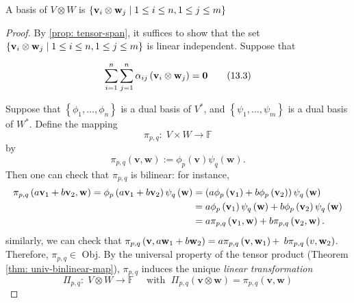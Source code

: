 \begin{theorem} \label{thm:tensorbasis}
    A basis of \(V \otimes  W\) is \(\left\{  {{\bf v}_{i} \otimes  {\bf w}_{j} \mid  1 \leq  i \leq  n,1 \leq  j \leq  m}\right\}\)
\end{theorem} 

\begin{proof}
By \autoref{prop: tensor-span}, it suffices to show that the set \(\left\{  {{\bf v}_{i} \otimes  {\bf w}_{j} \mid  1 \leq  i \leq  n,1 \leq  j \leq  m}\right\}\) is linear independent. Suppose that

\begin{equation}\label{eq: tensor-linear-independece}
    \mathop{\sum }\limits_{{i = 1}}^n\mathop{\sum }\limits_{{j = 1}}^n\alpha_{ij}\left( {{\bf v}_{i} \otimes  {\bf w}_{j}}\right)  = \mathbf{0} \tag{13.3}
\end{equation}


Suppose that \(\left\{  {{\phi }_1,\ldots ,{\phi }_n}\right\}\) is a dual basis of \({V}^{ * }\), and \(\left\{  {{\psi }_1,\ldots ,{\psi }_{m}}\right\}\) is a dual basis of \({W}^{ * }\). Define the mapping
\[
{\pi }_{p,q} : \;V \times  W \rightarrow  \mathbb{F}
\]
by 
$$\pi_{p,q}(\mathbf{v},\mathbf{w}) := {\phi }_{p}\left( \mathbf{v}\right) {\psi }_{q}\left( \mathbf{w}\right).$$
Then one can check that \({\pi }_{p,q}\) is bilinear: for instance,
\begin{align*}
{\pi }_{p,q}\left( {a{\bf v}_1 + b{\bf v}_2,\mathbf{w}}\right)  = {\phi }_{p}\left( {a{\bf v}_1 + b{\bf v}_2}\right) {\psi }_{q}\left( \mathbf{w}\right)
&= \left( {a{\phi }_{p}\left( {\bf v}_1\right)  + b{\phi }_{p}\left( {\bf v}_2\right) }\right) {\psi }_{q}\left( \mathbf{w}\right)\\
&= a{\phi }_{p}\left( {\bf v}_1\right) {\psi }_{q}\left( \mathbf{w}\right)  + b{\phi }_{p}\left( {\bf v}_2\right) {\psi }_{q}\left( \mathbf{w}\right)\\
&= a{\pi }_{p,q}\left( {{\bf v}_1,\mathbf{w}}\right)  + b{\pi }_{p,q}\left( {{\bf v}_2,\mathbf{w}}\right) .
\end{align*}
similarly, we can check that \({\pi }_{p,q}\left( {\mathbf{v},a{\bf w}_1 + b{\bf w}_2}\right)  = a{\pi }_{p,q}\left( {\mathbf{v},{\bf w}_1}\right)  +\)  \(b{\pi }_{p,q}\left( {v,{\bf w}_2}\right)\). Therefore, \({\pi }_{p,q} \in\) Obj. By the universal property of the tensor product (Theorem \ref{thm: univ-binlinear-map}), \({\pi }_{p,q}\) induces the unique {\it linear transformation}
\[
\Pi_{p,q} : \;V \otimes  W \rightarrow  \mathbb{F}
\quad \text{ with }\;\Pi_{p,q}\left( {\mathbf{v} \otimes  \mathbf{w}}\right)  = {\pi }_{p,q}\left( {\mathbf{v},\mathbf{w}}\right)
\]


\end{proof}
